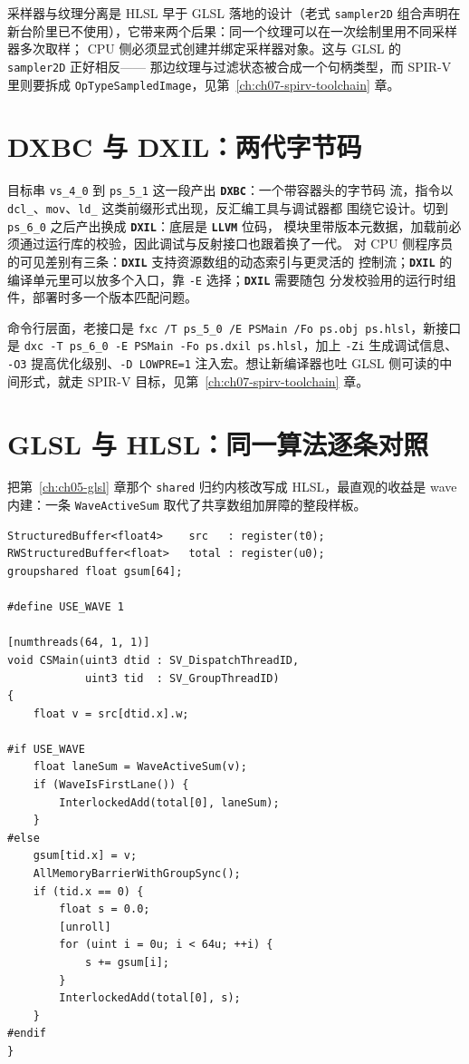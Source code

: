 \documentclass[12pt,a4paper,fontset=fandol]{ctexbook}
\newcommand{\Tp}[1]{\texttt{#1}}
\newcommand{\Bk}{\discretionary{}{}{}}
\newcommand{\Lib}[1]{\textbf{\texttt{#1}}}
\newcommand{\Lang}[1]{\textsf{#1}}
\newcommand{\DomCPU}{\Lang{CPU}}
\newcommand{\GSL}{\Lang{GLSL}}
\newcommand{\HSL}{\Lang{HLSL}}
\newcommand{\SPIV}{\Lang{SPIR-V}}
\begin{document}
采样器与纹理分离是 \HSL{} 早于 \GSL{} 落地的设计（老式 \Tp{sampler2D} 组合声明在
新台阶里已不使用），它带来两个后果：同一个纹理可以在一次绘制里用不同采样器多次取样；
\DomCPU{} 侧必须显式创建并绑定采样器对象。这与 \GSL{} 的 \Tp{sampler2D} 正好相反——
那边纹理与过滤状态被合成一个句柄类型，而 \SPIV{} 里则要拆成
\Tp{OpType\Bk SampledImage}，见第~\ref{ch:ch07-spirv-toolchain} 章。

\section{DXBC 与 DXIL：两代字节码}
\label{sec:ch06-bytecode}

目标串 \Tp{vs\_4\_0} 到 \Tp{ps\_5\_1} 这一段产出 \Lib{DXBC}：一个带容器头的字节码
流，指令以 \Tp{dcl\_}、\Tp{mov}、\Tp{ld\_} 这类前缀形式出现，反汇编工具与调试器都
围绕它设计。切到 \Tp{ps\_6\_0} 之后产出换成 \Lib{DXIL}：底层是 \Lib{LLVM} 位码，
模块里带版本元数据，加载前必须通过运行库的校验，因此调试与反射接口也跟着换了一代。
对 \DomCPU{} 侧程序员的可见差别有三条：\Lib{DXIL} 支持资源数组的动态索引与更灵活的
控制流；\Lib{DXIL} 的编译单元里可以放多个入口，靠 \Tp{-E} 选择；\Lib{DXIL} 需要随包
分发校验用的运行时组件，部署时多一个版本匹配问题。

命令行层面，老接口是 \Tp{fxc /T ps\_5\_0 /E PSMain /Fo ps.obj ps.hlsl}，新接口是
\Tp{dxc -T ps\_6\_0 -E PSMain -Fo ps.dxil ps.\Bk hlsl}，加上 \Tp{-Zi} 生成调试信息、
\Tp{-O3} 提高优化级别、\Tp{-D LOWPRE=1} 注入宏。想让新编译器也吐 \GSL{} 侧可读的中
间形式，就走 \SPIV{} 目标，见第~\ref{ch:ch07-spirv-toolchain} 章。

\section{\GSL{} 与 \HSL{}：同一算法逐条对照}

把第~\ref{ch:ch05-glsl} 章那个 \Tp{shared} 归约内核改写成 \HSL{}，最直观的收益是
wave 内建：一条 \Tp{Wave\Bk Active\Bk Sum} 取代了共享数组加屏障的整段样板。

\begin{lstlisting}[style=hlslstyle,caption={计算内核：wave 归约与组内归约两条路径，由宏切换},label={lst:ch06-cs}]
StructuredBuffer<float4>    src   : register(t0);
RWStructuredBuffer<float>   total : register(u0);
groupshared float gsum[64];

#define USE_WAVE 1

[numthreads(64, 1, 1)]
void CSMain(uint3 dtid : SV_DispatchThreadID,
            uint3 tid  : SV_GroupThreadID)
{
    float v = src[dtid.x].w;

#if USE_WAVE
    float laneSum = WaveActiveSum(v);
    if (WaveIsFirstLane()) {
        InterlockedAdd(total[0], laneSum);
    }
#else
    gsum[tid.x] = v;
    AllMemoryBarrierWithGroupSync();
    if (tid.x == 0) {
        float s = 0.0;
        [unroll]
        for (uint i = 0u; i < 64u; ++i) {
            s += gsum[i];
        }
        InterlockedAdd(total[0], s);
    }
#endif
}
\end{lstlisting}
\end{document}
